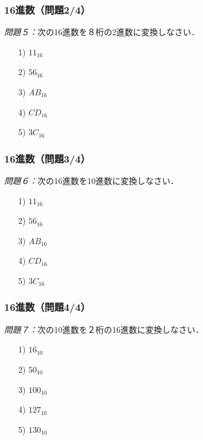 \documentclass{beamer}                 %
\begin{document}
\begin{frame}
  \frametitle{16進数（問題2/4）}
\emph{問題５：}次の16進数を８桁の2進数に変換しなさい．
\begin{enumerate}
\item[1)] $11_{16}$
\vfill
\item[2)] $56_{16}$
\vfill
\item[3)] $AB_{16}$
\vfill
\item[4)] $CD_{16}$
\vfill
\item[5)] $3C_{16}$
\vfill
\end{enumerate}
\end{frame}

\begin{frame}
  \frametitle{16進数（問題3/4）}
\emph{問題６：}次の16進数を10進数に変換しなさい．
\begin{enumerate}
\item[1)] $11_{16}$
\vfill
\item[2)] $56_{16}$
\vfill
\item[3)] $AB_{16}$
\vfill
\item[4)] $CD_{16}$
\vfill
\item[5)] $3C_{16}$
\vfill
\end{enumerate}
\end{frame}

\begin{frame}
  \frametitle{16進数（問題4/4）}
\emph{問題７：}次の10進数を２桁の16進数に変換しなさい．
\begin{enumerate}
\item[1)] $16_{10}$
\vfill
\item[2)] $50_{10}$
\vfill
\item[3)] $100_{10}$
\vfill
\item[4)] $127_{10}$
\vfill
\item[5)] $130_{10}$
\vfill
\end{enumerate}
\end{frame}
\end{document}
